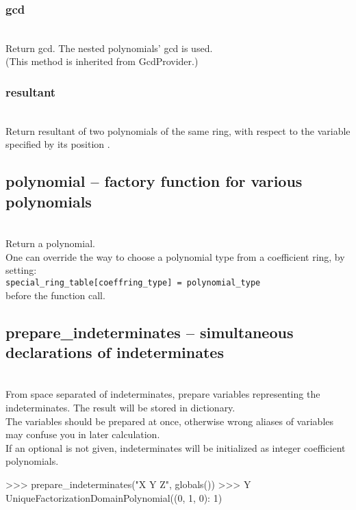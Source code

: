   \subsubsection{gcd}
  \\
  \quad Return gcd. The nested polynomials' gcd is used.\\
  (This method is inherited from GcdProvider.)

  \subsubsection{resultant}
  \\
  \quad Return resultant of two polynomials of the same ring,
  with respect to the variable specified by its position .

 \subsection{polynomial -- factory function for various polynomials}
  \\
   \spacing
   \quad Return a polynomial.\\
   \spacing
   \quad \negok One can override the way to choose a polynomial type
   from a coefficient ring, by setting:\\
   {\tt special\_ring\_table[coeffring\_type] = polynomial\_type}\\
   before the function call.

 \subsection{prepare\_indeterminates -- simultaneous declarations of indeterminates}
 \\
 \spacing
 \quad From space separated  of indeterminates, prepare variables
 representing the indeterminates.  The result will be stored in 
 dictionary.\\
 \quad The variables should be prepared at once, otherwise wrong aliases of
 variables may confuse you in later calculation.\\
 \quad If an optional  is not given, indeterminates will be
 initialized as integer coefficient polynomials.\\

\begin{ex}
>>> prepare_indeterminates("X Y Z", globals())
>>> Y
UniqueFactorizationDomainPolynomial({(0, 1, 0): 1})
\end{ex}
\C



